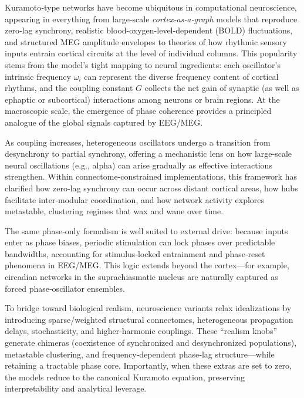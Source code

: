 \documentclass[11pt]{article}
\numberwithin{equation}{section}
\begin{document}
Kuramoto‑type networks have become ubiquitous in computational neuroscience, appearing in everything from large‑scale \textit{cortex‑as‑a‑graph} models that reproduce zero‑lag synchrony, realistic  blood-oxygen-level-dependent (BOLD) fluctuations, and structured MEG amplitude envelopes\cite{Breakspear2010,cabral_role_2011,Cabral2014MEGDelays,Cabral2014} to theories of how rhythmic sensory inputs entrain cortical circuits at the level of individual columns\cite{Buzsaki2006}. This popularity stems from the model’s tight mapping to neural ingredients: each oscillator’s intrinsic frequency $\omega_i$ can represent the diverse frequency content of cortical rhythms, and the coupling constant $G$ collects the net gain of synaptic (as well as ephaptic or subcortical) interactions among neurons or brain regions. At the macroscopic scale, the emergence of phase coherence provides a principled analogue of the global signals captured by EEG/MEG\cite{Breakspear2010,Cabral2011}.

As coupling increases, heterogeneous oscillators undergo a transition from desynchrony to partial synchrony\cite{Kuramoto1975,Acebron2005}, offering a mechanistic lens on how large‑scale neural oscillations (e.g., alpha) can arise gradually as effective interactions strengthen. Within connectome‑constrained implementations, this framework has clarified how zero‑lag synchrony can occur across distant cortical areas, how hubs facilitate inter‑modular coordination, and how network activity explores metastable, clustering regimes that wax and wane over time\cite{Schmidt2015KuramotoHubs,Shanahan2010Chimera,Hizanidis2016SciRep,Cabral2014PNB}.

The same phase‑only formalism is well suited to external drive: because inputs enter as phase biases, periodic stimulation can lock phases over predictable bandwidths, accounting for stimulus‑locked entrainment and phase‑reset phenomena in EEG/MEG\cite{Buzsaki2006}. This logic extends beyond the cortex—for example, circadian networks in the suprachiasmatic nucleus are naturally captured as forced phase‑oscillator ensembles\cite{Gu2012SCN}.

To bridge toward biological realism, neuroscience variants relax idealizations by introducing sparse/weighted structural connectomes, heterogeneous propagation delays, stochasticity, and higher‑harmonic couplings. These “realism knobs” generate chimeras (coexistence of synchronized and desynchronized populations), metastable clustering, and frequency‑dependent phase‑lag structure—while retaining a tractable phase core\cite{Shanahan2010Chimera,Hizanidis2016SciRep,Petkoski2016PRE,Petkoski2018PhaseLags,Petkoski2019PhilTransA}. Importantly, when these extras are set to zero, the models reduce to the canonical Kuramoto equation, preserving interpretability and analytical leverage.
\end{document}
